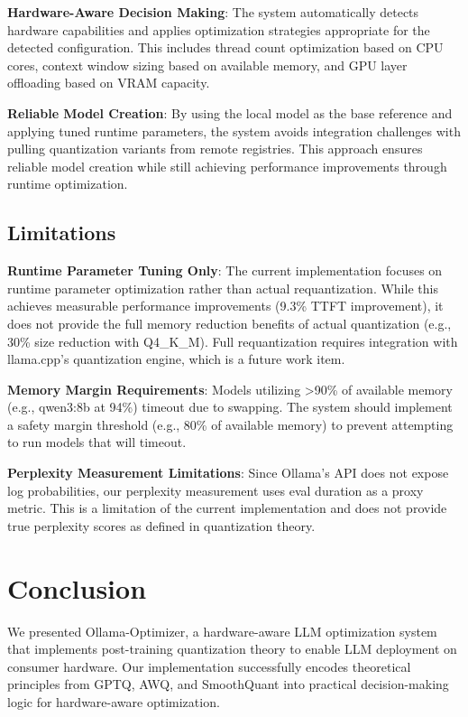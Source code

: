 \documentclass[journal]{IEEEtran}
\begin{document}
\textbf{Hardware-Aware Decision Making}: The system automatically detects hardware capabilities and applies optimization strategies appropriate for the detected configuration. This includes thread count optimization based on CPU cores, context window sizing based on available memory, and GPU layer offloading based on VRAM capacity.

\textbf{Reliable Model Creation}: By using the local model as the base reference and applying tuned runtime parameters, the system avoids integration challenges with pulling quantization variants from remote registries. This approach ensures reliable model creation while still achieving performance improvements through runtime optimization.

\subsection{Limitations}

\textbf{Runtime Parameter Tuning Only}: The current implementation focuses on runtime parameter optimization rather than actual requantization. While this achieves measurable performance improvements (9.3\% TTFT improvement), it does not provide the full memory reduction benefits of actual quantization (e.g., 30\% size reduction with Q4\_K\_M). Full requantization requires integration with llama.cpp's quantization engine, which is a future work item.

\textbf{Memory Margin Requirements}: Models utilizing >90\% of available memory (e.g., qwen3:8b at 94\%) timeout due to swapping. The system should implement a safety margin threshold (e.g., 80\% of available memory) to prevent attempting to run models that will timeout.

\textbf{Perplexity Measurement Limitations}: Since Ollama's API does not expose log probabilities, our perplexity measurement uses eval duration as a proxy metric. This is a limitation of the current implementation and does not provide true perplexity scores as defined in quantization theory.

\section{Conclusion}

We presented Ollama-Optimizer, a hardware-aware LLM optimization system that implements post-training quantization theory to enable LLM deployment on consumer hardware. Our implementation successfully encodes theoretical principles from GPTQ, AWQ, and SmoothQuant into practical decision-making logic for hardware-aware optimization.
\end{document}
